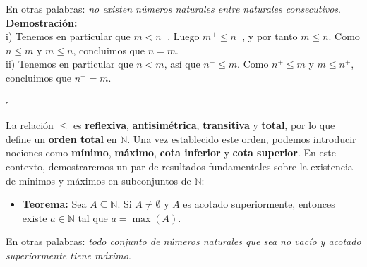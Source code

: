 \documentclass[10 pt]{article}
\begin{document}
\Large{En otras palabras: \textit{no existen números naturales entre naturales consecutivos}.} \\

\Large{\textbf{Demostración:} \\

i) Tenemos en particular que $m<n^+$. Luego $m^+ \leq n^+$, y por tanto $m \leq n$. Como $n \leq m$ y $m \leq n$, concluimos que $n=m$. \\

ii) Tenemos en particular que $n<m$, así que $n^+ \leq m$. Como $n^+ \leq m$ y $m \leq n^+$, concluimos que $n^+=m$.} \\

\begin{flushright}
    $\square$
\end{flushright}

\Large{La relación $\leq$ es \textbf{reflexiva}, \textbf{antisimétrica}, \textbf{transitiva} y \textbf{total}, por lo que define un \textbf{orden total} en $\mathbb N$. Una vez establecido este orden, podemos introducir nociones como \textbf{mínimo}, \textbf{máximo}, \textbf{cota inferior} y \textbf{cota superior}. En este contexto, demostraremos un par de resultados fundamentales sobre la existencia de mínimos y máximos en subconjuntos de $\mathbb N$:} \\

\begin{itemize}
    \item \Large{\textbf{Teorema:} Sea $A \subseteq \mathbb N$. Si $A \neq \emptyset$ y $A$ es acotado superiormente, entonces existe $a \in \mathbb N$ tal que $a=\max(A)$.} \\
\end{itemize}

\Large{En otras palabras: \textit{todo conjunto de números naturales que sea no vacío y acotado superiormente tiene máximo}.} \\
\end{document}
